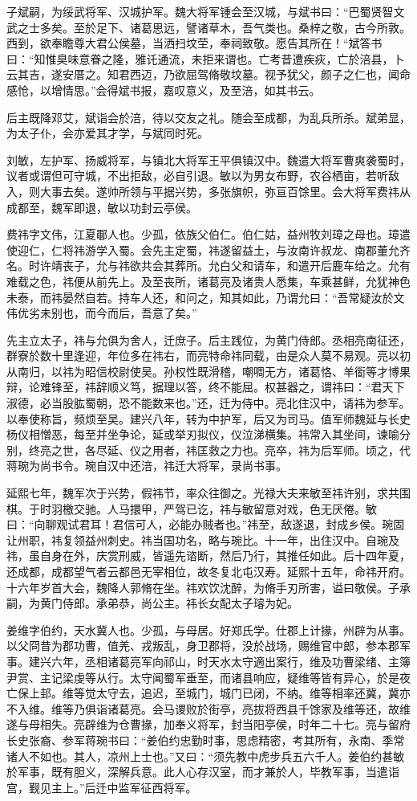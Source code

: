 \documentclass[12pt,UTF8]{ctexbook}
\begin{document}
子斌嗣，为绥武将军、汉城护军。魏大将军锺会至汉城，与斌书曰：“巴蜀贤智文武之士多矣。至於足下、诸葛思远，譬诸草木，吾气类也。桑梓之敬，古今所敦。西到，欲奉瞻尊大君公侯墓，当洒扫坟茔，奉祠致敬。愿告其所在！“斌答书曰：“知惟臭味意眷之隆，雅讬通流，未拒来谓也。亡考昔遭疾疢，亡於涪县，卜云其吉，遂安厝之。知君西迈，乃欲屈驾脩敬坟墓。视予犹父，颜子之仁也，闻命感怆，以增情思。”会得斌书报，嘉叹意义，及至涪，如其书云。

后主既降邓艾，斌诣会於涪，待以交友之礼。随会至成都，为乱兵所杀。斌弟显，为太子仆，会亦爱其才学，与斌同时死。

刘敏，左护军、扬威将军，与镇北大将军王平俱镇汉中。魏遣大将军曹爽袭蜀时，议者或谓但可守城，不出拒敌，必自引退。敏以为男女布野，农谷栖亩，若听敌入，则大事去矣。遂帅所领与平据兴势，多张旗帜，弥亘百馀里。会大将军费祎从成都至，魏军即退，敏以功封云亭侯。

费祎字文伟，江夏鄳人也。少孤，依族父伯仁。伯仁姑，益州牧刘璋之母也。璋遣使迎仁，仁将祎游学入蜀。会先主定蜀，祎遂留益土，与汝南许叔龙、南郡董允齐名。时许靖丧子，允与祎欲共会其葬所。允白父和请车，和遣开后鹿车给之。允有难载之色，祎便从前先上。及至丧所，诸葛亮及诸贵人悉集，车乘甚鲜，允犹神色未泰，而祎晏然自若。持车人还，和问之，知其如此，乃谓允曰：“吾常疑汝於文伟优劣未别也，而今而后，吾意了矣。”

先主立太子，祎与允俱为舍人，迁庶子。后主践位，为黄门侍郎。丞相亮南征还，群寮於数十里逢迎，年位多在祎右，而亮特命祎同载，由是众人莫不易观。亮以初从南归，以祎为昭信校尉使吴。孙权性既滑稽，嘲啁无方，诸葛恪、羊衟等才博果辩，论难锋至，祎辞顺义笃，据理以答，终不能屈。权甚器之，谓祎曰：“君天下淑德，必当股肱蜀朝，恐不能数来也。”还，迁为侍中。亮北住汉中，请祎为参军。以奉使称旨，频烦至吴。建兴八年，转为中护军，后又为司马。值军师魏延与长史杨仪相憎恶，每至并坐争论，延或举刃拟仪，仪泣涕横集。祎常入其坐间，谏喻分别，终亮之世，各尽延、仪之用者，祎匡救之力也。亮卒，祎为后军师。顷之，代蒋琬为尚书令。琬自汉中还涪，祎迁大将军，录尚书事。

延熙七年，魏军次于兴势，假祎节，率众往御之。光禄大夫来敏至祎许别，求共围棋。于时羽檄交驰。人马擐甲，严驾已讫，祎与敏留意对戏，色无厌倦。敏曰：“向聊观试君耳！君信可人，必能办贼者也。”祎至，敌遂退，封成乡侯。琬固让州职，祎复领益州刺史。祎当国功名，略与琬比。十一年，出住汉中。自琬及祎，虽自身在外，庆赏刑威，皆遥先谘断，然后乃行，其推任如此。后十四年夏，还成都，成都望气者云都邑无宰相位，故冬复北屯汉寿。延熙十五年，命祎开府。十六年岁首大会，魏降人郭脩在坐。祎欢饮沈醉，为脩手刃所害，谥曰敬侯。子承嗣，为黄门侍郎。承弟恭，尚公主。祎长女配太子璿为妃。

姜维字伯约，天水冀人也。少孤，与母居。好郑氏学。仕郡上计掾，州辟为从事。以父冏昔为郡功曹，值羌、戎叛乱，身卫郡将，没於战场，赐维官中郎，参本郡军事。建兴六年，丞相诸葛亮军向祁山，时天水太守適出案行，维及功曹梁绪、主簿尹赏、主记梁虔等从行。太守闻蜀军垂至，而诸县响应，疑维等皆有异心，於是夜亡保上邽。维等觉太守去，追迟，至城门，城门已闭，不纳。维等相率还冀，冀亦不入维。维等乃俱诣诸葛亮。会马谡败於街亭，亮拔将西县千馀家及维等还，故维遂与母相失。亮辟维为仓曹掾，加奉义将军，封当阳亭侯，时年二十七。亮与留府长史张裔、参军蒋琬书曰：“姜伯约忠勤时事，思虑精密，考其所有，永南、季常诸人不如也。其人，凉州上士也。”又曰：“须先教中虎步兵五六千人。姜伯约甚敏於军事，既有胆义，深解兵意。此人心存汉室，而才兼於人，毕教军事，当遣诣宫，觐见主上。”后迁中监军征西将军。
\end{document}
